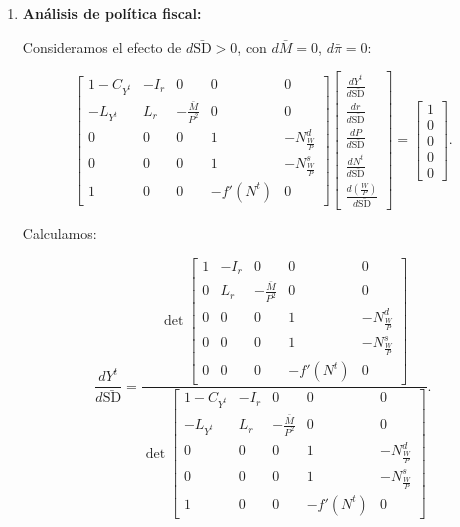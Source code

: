 \documentclass[
  doc,
  floatsintext,
  longtable,
  a4paper,
  nolmodern,
  notxfonts,
  notimes,
  12pt,
  colorlinks=true,linkcolor=blue,citecolor=blue,urlcolor=blue]{apa7}
\begin{document}
\begin{enumerate}
  El determinante no es cero, lo que indica que el sistema es invertible
  y tiene solución única bajo las condiciones del modelo.
\item
  \textbf{Análisis de política fiscal:}

  Consideramos el efecto de \(d\bar{\mathrm{SD}} > 0\), con
  \(d\bar{M} = 0\), \(d\bar{\pi} = 0\):

  \[
  \begin{bmatrix}
  1 - C_{Y^t} & -I_r & 0 & 0 & 0 \\
  -L_{Y^t} & L_r & -\frac{\bar{M}}{P^2} & 0 & 0 \\
  0 & 0 & 0 & 1 & -N^d_{\frac{W}{P}} \\
  0 & 0 & 0 & 1 & -N^s_{\frac{W}{P}} \\
  1 & 0 & 0 & -f'(N^t) & 0
  \end{bmatrix}
  \begin{bmatrix}
  \frac{dY^t}{d\bar{\mathrm{SD}}} \\
  \frac{dr}{d\bar{\mathrm{SD}}} \\
  \frac{dP}{d\bar{\mathrm{SD}}} \\
  \frac{dN^t}{d\bar{\mathrm{SD}}} \\
  \frac{d \left( \frac{W}{P} \right)}{d\bar{\mathrm{SD}}}
  \end{bmatrix}
  = \begin{bmatrix}
  1 \\
  0 \\
  0 \\
  0 \\
  0
  \end{bmatrix}.
  \]

  Calculamos:

  \[
  \frac{dY^t}{d\bar{\mathrm{SD}}} = \frac{\det \begin{bmatrix}
  1 & -I_r & 0 & 0 & 0 \\
  0 & L_r & -\frac{\bar{M}}{P^2} & 0 & 0 \\
  0 & 0 & 0 & 1 & -N^d_{\frac{W}{P}} \\
  0 & 0 & 0 & 1 & -N^s_{\frac{W}{P}} \\
  0 & 0 & 0 & -f'(N^t) & 0
  \end{bmatrix}}{\det \begin{bmatrix}
  1 - C_{Y^t} & -I_r & 0 & 0 & 0 \\
  -L_{Y^t} & L_r & -\frac{\bar{M}}{P^2} & 0 & 0 \\
  0 & 0 & 0 & 1 & -N^d_{\frac{W}{P}} \\
  0 & 0 & 0 & 1 & -N^s_{\frac{W}{P}} \\
  1 & 0 & 0 & -f'(N^t) & 0
  \end{bmatrix}}.
  \]


\end{enumerate}
\end{document}
